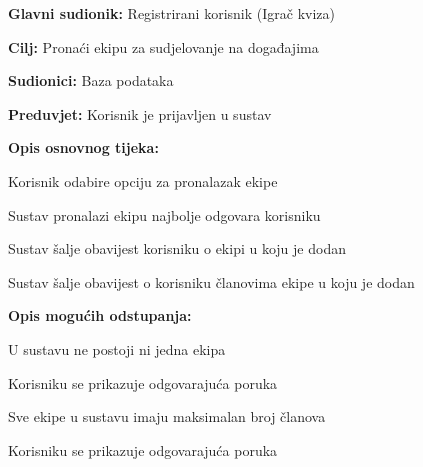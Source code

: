 				
				\noindent {}
				\begin{packed_item}
					
					\item \textbf{Glavni sudionik:} Registrirani korisnik (Igrač kviza)
					\item  \textbf{Cilj:} Pronaći ekipu za sudjelovanje na događajima
					\item  \textbf{Sudionici:} Baza podataka
					\item  \textbf{Preduvjet:} Korisnik je prijavljen u sustav
					\item  \textbf{Opis osnovnog tijeka:}
					
					\item[] \begin{packed_enum}
						
						\item Korisnik odabire opciju za pronalazak ekipe
						\item Sustav pronalazi ekipu najbolje odgovara korisniku
						\item Sustav šalje obavijest korisniku o ekipi u koju je dodan
						\item Sustav šalje obavijest  o korisniku članovima ekipe u koju je dodan 
						
					\end{packed_enum}
					
					\item  \textbf{Opis mogućih odstupanja:}
					
					\item[] \begin{packed_item}
						
						\item[2.a] U sustavu ne postoji ni jedna ekipa
						\item[] \begin{packed_enum}
							
							\item Korisniku se prikazuje odgovarajuća poruka
							
						\end{packed_enum}
						
						\item[2.b] Sve ekipe u sustavu imaju maksimalan broj članova
						\item[] \begin{packed_enum}
							
							\item Korisniku se prikazuje odgovarajuća poruka
							
						\end{packed_enum}
						
					\end{packed_item}				
				\end{packed_item}
				
